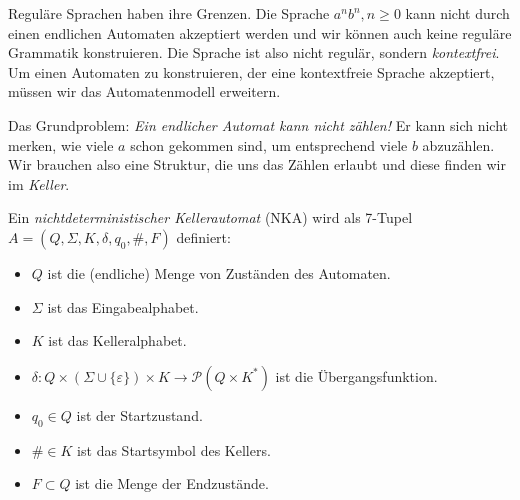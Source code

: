 \documentclass[fontsize=10pt, a4paper, ngerman]{scrartcl}
\begin{document}
\ReiheTitel

Reguläre Sprachen haben ihre Grenzen. Die Sprache $a^nb^n, n\geq 0$
kann nicht durch einen endlichen Automaten akzeptiert werden und wir
können auch keine reguläre Grammatik konstruieren. Die Sprache ist also
nicht regulär, sondern \emph{kontextfrei}. Um einen Automaten zu
konstruieren, der eine kontextfreie Sprache akzeptiert, müssen wir das
Automatenmodell erweitern.

Das Grundproblem: \emph{Ein endlicher Automat kann nicht zählen!} Er
kann sich nicht merken, wie viele $a$ schon gekommen sind, um
entsprechend viele $b$ abzuzählen. Wir brauchen also eine Struktur, die
uns das Zählen erlaubt und diese finden wir im \emph{Keller}.

\begin{infobox}
Ein \emph{nichtdeterministischer Kellerautomat} (NKA) wird als 7-Tupel
$A = (Q, \Sigma, K, \delta, q_0, \#, F)$ definiert:
\begin{itemize}
	\item $Q$ ist die (endliche) Menge von Zuständen des Automaten.
	\item $\Sigma$ ist das Eingabealphabet.
	\item $K$ ist das Kelleralphabet.
	\item $\delta: Q\times (\Sigma\cup \{\varepsilon\}) \times K\rightarrow \mathcal P(Q \times K^{*})$
		ist die Übergangsfunktion.
	\item $q_0\in Q$ ist der Startzustand.
	\item $\#\in K$ ist das Startsymbol des Kellers.
	\item $F\subset Q$ ist die Menge der Endzustände.
\end{itemize}
\end{infobox}
\end{document}
